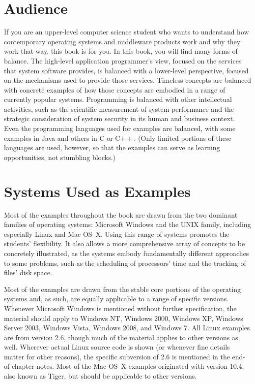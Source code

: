 \section*{Audience}

If you are an upper-level computer science student who wants to
understand how contemporary operating systems and middleware products
work and why they work that way, this book is for you.  In this book,
you will find many forms of balance.  The high-level application
programmer's view, focused on the services that system software
provides, is balanced with a lower-level perspective, focused on the
mechanisms used to provide those services.  Timeless concepts are
balanced with concrete examples of how those concepts are embodied in
a range of currently popular systems.  Programming is balanced with
other intellectual activities, such as the scientific measurement of system
performance and the strategic consideration of system security in its
human and business context. Even the programming languages used for
examples are balanced, with some examples in Java and others in C or
C$++$.  (Only limited portions of these languages are used, however,
so that the examples can serve as learning opportunities, not
stumbling blocks.)

\section*{Systems Used as Examples}

Most of the examples throughout the book are drawn from the two
dominant families of operating systems: Microsoft Windows and the UNIX
family, including especially Linux and Mac OS~X.  Using this range of
systems promotes the students' flexibility.  It also allows a more
comprehensive array of concepts to be concretely illustrated, as the
systems embody fundamentally different approaches to some problems,
such as the scheduling of processors' time and the tracking of files'
disk space.

Most of the examples are drawn from the stable core portions of the
operating systems and, as such, are equally applicable to a range of
specific versions.  Whenever Microsoft Windows is mentioned without
further specification, the material should apply to Windows NT, Windows
2000, Windows XP, Windows Server 2003, Windows Vista, Windows 2008, and Windows 7.  All Linux
examples are from version 2.6, though much of the material applies to
other versions as well.  Wherever actual Linux source code is shown
(or whenever fine details matter for other reasons), the specific subversion of
2.6 is mentioned in the end-of-chapter notes.  Most of the Mac OS~X examples
originated with version 10.4, also known as Tiger, but should be applicable to other versions.

